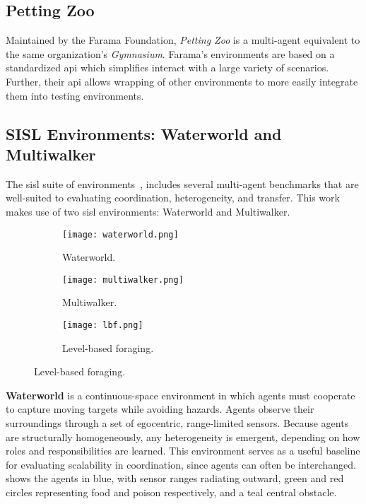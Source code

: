     \subsection*{Petting Zoo}

Maintained by the Farama Foundation, \emph{Petting Zoo} is a 
multi-agent equivalent to the same organization's \emph{Gymnasium}.
Farama's environments are based on a standardized \gls{api}
which simplifies interact with a large variety of scenarios.
Further, their \gls{api} allows wrapping of other environments
to more easily integrate them into testing environments.

   \subsection*{SISL Environments: Waterworld and Multiwalker}

The \gls{sisl} suite of environments~\cite{gupta2017}, includes several 
multi-agent benchmarks that are well-suited to evaluating coordination, 
heterogeneity, and transfer. This work makes use of two \gls{sisl} environments: 
Waterworld and Multiwalker.

\begin{figure}[ht]
    \centering
    \caption{Environments used in this work.}
    \begin{subfigure}{0.3\textwidth}
        \texttt{[image: waterworld.png]}
        \caption{Waterworld.}
        \label{fig:waterworld}
    \end{subfigure}
    \hfil
    \begin{subfigure}{0.3\textwidth}
        \texttt{[image: multiwalker.png]}
        \caption{Multiwalker.}
        \label{fig:multiwalker}
    \end{subfigure}
    \hfil
    \begin{subfigure}{0.3\textwidth}
        \texttt{[image: lbf.png]}
        \caption{Level-based foraging.}
        \label{fig:lbf}
    \end{subfigure}
\end{figure}

\textbf{Waterworld} is a continuous-space environment in which agents 
must cooperate to capture moving targets while avoiding hazards. 
Agents observe their surroundings through a set of egocentric, 
range-limited sensors. Because agents are structurally homogeneously, 
any heterogeneity is emergent, depending on how roles and responsibilities 
are learned. This environment serves as a useful baseline for evaluating 
scalability in coordination, since agents can often be interchanged.
 shows the agents in blue, with sensor ranges radiating outward,
green and red circles representing food and poison respectively, and a
teal central obstacle.

